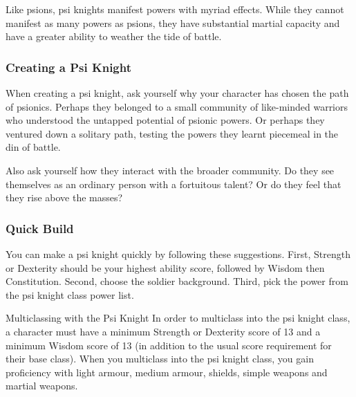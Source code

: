 Like psions, psi knights manifest powers with myriad effects.
While they cannot manifest as many powers as psions,
they have substantial martial capacity
and have a greater ability to weather the tide of battle. 

\subsubsection{Creating a Psi Knight}
When creating a psi knight,
ask yourself why your character has chosen the path of psionics.
Perhaps they belonged to a small community of like-minded warriors
who understood the untapped potential of psionic powers.
Or perhaps they ventured down a solitary path,
testing the powers they learnt piecemeal in the din of battle.

Also ask yourself how they interact with the broader community.
Do they see themselves as an ordinary person with a fortuitous
talent?
Or do they feel that they rise above the masses?

\subsubsection{Quick Build}
You can make a psi knight quickly by following these suggestions.
First, Strength or Dexterity should be your highest ability score,
followed by Wisdom then Constitution.
Second, choose the soldier background.
Third, pick the  power
from the psi knight class power list.

\begin{DndSidebar}[float=htbp]{Multiclassing with the Psi Knight}
    In order to multiclass into the psi knight class,
    a character must have a minimum Strength or Dexterity score of 13
    and a minimum Wisdom score of 13
    (in addition to the usual score requirement for their base class).
    When you multiclass into the psi knight class,
    you gain proficiency with
    light armour, medium armour, shields, simple weapons
    and martial weapons.
\end{DndSidebar}

